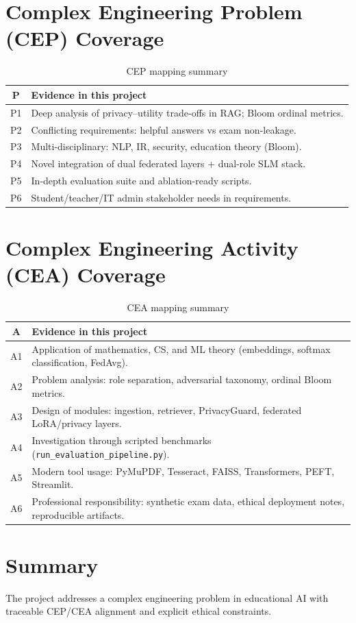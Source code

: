 \section{Complex Engineering Problem (CEP) Coverage}
\begin{table}[H]
\centering
\caption{CEP mapping summary}
\label{tab:cep_mapping}
\renewcommand{\arraystretch}{1.2}
\small
\begin{tabular}{|c|p{9.5cm}|}
\hline
\textbf{P} & \textbf{Evidence in this project} \\
\hline
P1 & Deep analysis of privacy--utility trade-offs in RAG; Bloom ordinal metrics. \\
\hline
P2 & Conflicting requirements: helpful answers vs exam non-leakage. \\
\hline
P3 & Multi-disciplinary: NLP, IR, security, education theory (Bloom). \\
\hline
P4 & Novel integration of dual federated layers + dual-role SLM stack. \\
\hline
P5 & In-depth evaluation suite and ablation-ready scripts. \\
\hline
P6 & Student/teacher/IT admin stakeholder needs in requirements. \\
\hline
\end{tabular}
\end{table}

\section{Complex Engineering Activity (CEA) Coverage}
\begin{table}[H]
\centering
\caption{CEA mapping summary}
\label{tab:cea_mapping}
\renewcommand{\arraystretch}{1.2}
\small
\begin{tabular}{|c|p{9.5cm}|}
\hline
\textbf{A} & \textbf{Evidence in this project} \\
\hline
A1 & Application of mathematics, CS, and ML theory (embeddings, softmax classification, FedAvg). \\
\hline
A2 & Problem analysis: role separation, adversarial taxonomy, ordinal Bloom metrics. \\
\hline
A3 & Design of modules: ingestion, retriever, PrivacyGuard, federated LoRA/privacy layers. \\
\hline
A4 & Investigation through scripted benchmarks (\texttt{run\_evaluation\_pipeline.py}). \\
\hline
A5 & Modern tool usage: PyMuPDF, Tesseract, FAISS, Transformers, PEFT, Streamlit. \\
\hline
A6 & Professional responsibility: synthetic exam data, ethical deployment notes, reproducible artifacts. \\
\hline
\end{tabular}
\end{table}

\section{Summary}
The project addresses a complex engineering problem in educational AI with traceable CEP/CEA alignment and explicit ethical constraints.

